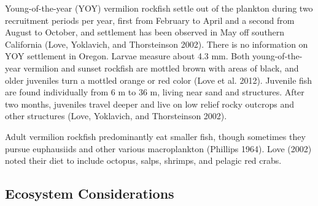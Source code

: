 \documentclass[11pt,
  english,
  a4paper,
]{article}
\begin{document}
\leavevmode\tagmcend\tagstructend\par


Young-of-the-year (YOY) vermilion rockfish settle out of the plankton during two recruitment periods per year, first from February to April and a second from August to October, and settlement has been observed in May off southern California {(Love, Yoklavich, and Thorsteinson 2002)\leavevmode\tagmcend\tagstructend}. There is no information on YOY settlement in Oregon. Larvae measure about 4.3 mm. Both young-of-the-year vermilion and sunset rockfish are mottled brown with areas of black, and older juveniles turn a mottled orange or red color {(Love et al. 2012)\leavevmode\tagmcend\tagstructend}. Juvenile fish are found individually from 6 m to 36 m, living near sand and structures. After two months, juveniles travel deeper and live on low relief rocky outcrops and other structures {(Love, Yoklavich, and Thorsteinson 2002)\leavevmode\tagmcend\tagstructend}.

\leavevmode\tagmcend\tagstructend\par


Adult vermilion rockfish predominantly eat smaller fish, though sometimes they pursue euphausiids and other various macroplankton {(Phillips 1964)\leavevmode\tagmcend\tagstructend}. Love {(2002)\leavevmode\tagmcend\tagstructend} noted their diet to include octopus, salps, shrimps, and pelagic red crabs.

\leavevmode\tagmcend\tagstructend\par


\hypertarget{ecosystem-considerations-1}{%
\subsection{Ecosystem Considerations}\label{ecosystem-considerations-1}}

\leavevmode\tagmcend\tagstructend

\end{document}
